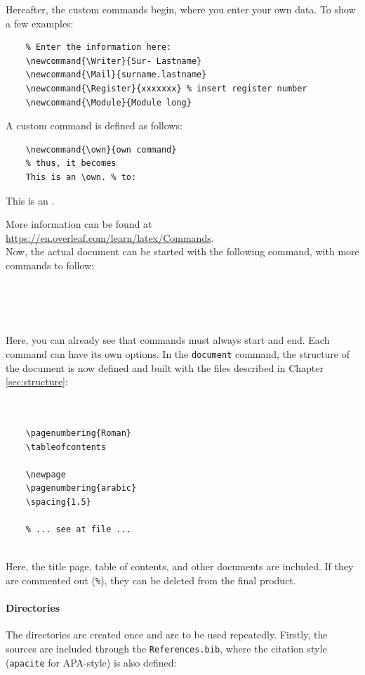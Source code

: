 Hereafter, the custom commands begin, where you enter your own data. To show a few examples:

\begin{verbatim}
    % Enter the information here:
    \newcommand{\Writer}{Sur- Lastname}
    \newcommand{\Mail}{surname.lastname}
    \newcommand{\Register}{xxxxxxx} % insert register number
    \newcommand{\Module}{Module long}
\end{verbatim}

A custom command is defined as follows:

\begin{verbatim}
    \newcommand{\own}{own command}
    % thus, it becomes
    This is an \own. % to:
\end{verbatim}

This is an \own.

More information can be found at \url{https://en.overleaf.com/learn/latex/Commands}.\\

Now, the actual document can be started with the following command, with more commands to follow:

\begin{verbatim}
    
    
    
\end{verbatim}

Here, you can already see that commands must always start and end. Each command can have its own options. In the \verb|document| command, the structure of the document is now defined and built with the files described in Chapter \ref{sec:structure}:

\begin{verbatim}
    

    \pagenumbering{Roman}
    \tableofcontents
    
    \newpage
    \pagenumbering{arabic}
    \spacing{1.5}
    
    % ... see at file ...
    
\end{verbatim}

Here, the title page, table of contents, and other documents are included. If they are commented out (\verb|%|), they can be \glqq deleted\grqq{} from the final product.


\paragraph{Directories}

The directories are created once and are to be used repeatedly. Firstly, the sources are included through the \verb|References.bib|, where the citation style (\verb|apacite| for APA-style) is also defined:

